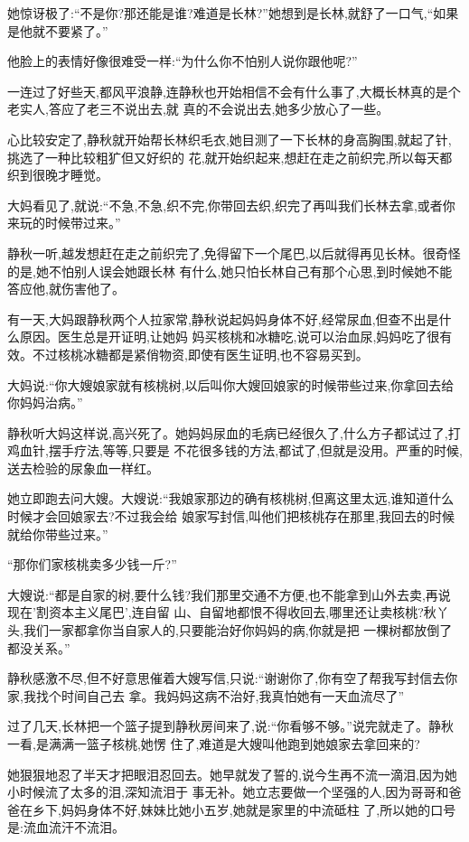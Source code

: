 ﻿\documentclass[12pt]{article}
\begin{document}
她惊讶极了:``不是你?那\myrule 还能是谁?难道是长林?''她想到是长林,就舒了一口气,``如果是他就不要紧了。''

他脸上的表情好像很难受一样:``为什么你不怕别人说你跟他\myrule 呢?''

一连过了好些天,都风平浪静,连静秋也开始相信不会有什么事了,大概长林真的是个老实人,答应了老三不说出去,就
真的不会说出去,她多少放心了一些。

心比较安定了,静秋就开始帮长林织毛衣,她目测了一下长林的身高胸围,就起了针,挑选了一种比较粗犷但又好织的
花,就开始织起来,想赶在走之前织完,所以每天都织到很晚才睡觉。

大妈看见了,就说:``不急,不急,织不完,你带回去织,织完了再叫我们长林去拿,或者你来玩的时候带过来。''

静秋一听,越发想赶在走之前织完了,免得留下一个尾巴,以后就得再见长林。很奇怪的是,她不怕别人误会她跟长林
有什么,她只怕长林自己有那个心思,到时候她不能答应他,就伤害他了。


有一天,大妈跟静秋两个人拉家常,静秋说起妈妈身体不好,经常尿血,但查不出是什么原因。医生总是开证明,让她妈
妈买核桃和冰糖吃,说可以治血尿,妈妈吃了很有效。不过核桃冰糖都是紧俏物资,即使有医生证明,也不容易买到。

大妈说:``你大嫂娘家就有核桃树,以后叫你大嫂回娘家的时候带些过来,你拿回去给你妈妈治病。''

静秋听大妈这样说,高兴死了。她妈妈尿血的毛病已经很久了,什么方子都试过了,打鸡血针,摆手疗法,等等,只要是
不花很多钱的方法,都试了,但就是没用。严重的时候,送去检验的尿象血一样红。

她立即跑去问大嫂。大嫂说:``我娘家那边的确有核桃树,但离这里太远,谁知道什么时候才会回娘家去?不过我会给
娘家写封信,叫他们把核桃存在那里,我回去的时候就给你带些过来。''

``那\myrule 你们家核桃卖多少钱一斤?''

大嫂说:``都是自家的树,要什么钱?我们那里交通不方便,也不能拿到山外去卖,再说现在'割资本主义尾巴',连自留
山、自留地都恨不得收回去,哪里还让卖核桃?秋丫头,我们一家都拿你当自家人的,只要能治好你妈妈的病,你就是把
一棵树都放倒了都没关系。''

静秋感激不尽,但不好意思催着大嫂写信,只说:``谢谢你了,你有空了帮我写封信去你家\myrule ,我找个时间自己去
拿。我妈妈这病不治好,我真怕她有一天血流尽了\myrule ''

过了几天,长林把一个篮子提到静秋房间来了,说:``你看够不够。''说完就走了。静秋一看,是满满一篮子核桃,她愣
住了,难道是大嫂叫他跑到她娘家去拿回来的?

她狠狠地忍了半天才把眼泪忍回去。她早就发了誓的,说今生再不流一滴泪,因为她小时候流了太多的泪,深知流泪于
事无补。她立志要做一个坚强的人,因为哥哥和爸爸在乡下,妈妈身体不好,妹妹比她小五岁,她就是家里的中流砥柱
了,所以她的口号是:流血流汗不流泪。
\end{document}

